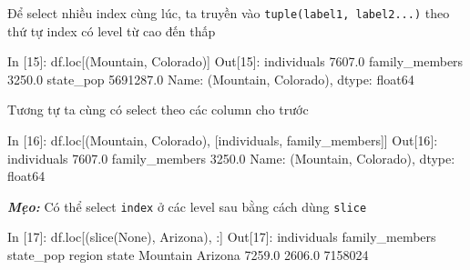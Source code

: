 \documentclass[
]{book}
\makeatletter
\newenvironment{Shaded}{\begin{snugshade}}{\end{snugshade}}
\newcommand{\BuiltInTok}[1]{#1}
\newcommand{\DecValTok}[1]{\textcolor[rgb]{0.00,0.00,0.81}{#1}}
\newcommand{\FloatTok}[1]{\textcolor[rgb]{0.00,0.00,0.81}{#1}}
\newcommand{\NormalTok}[1]{#1}
\newcommand{\StringTok}[1]{\textcolor[rgb]{0.31,0.60,0.02}{#1}}
\newcommand{\VariableTok}[1]{\textcolor[rgb]{0.00,0.00,0.00}{#1}}
\newenvironment{kframe}{%
\medskip{}
\setlength{\fboxsep}{.8em}
 \def\at@end@of@kframe{}%
 \ifinner\ifhmode%
  \def\at@end@of@kframe{\end{minipage}}%
  \begin{minipage}{\columnwidth}%
 \fi\fi%
 \def\FrameCommand##1{\hskip\@totalleftmargin \hskip-\fboxsep
 \colorbox{shadecolor}{##1}\hskip-\fboxsep
     \hskip-\linewidth \hskip-\@totalleftmargin \hskip\columnwidth}%
 \MakeFramed {\advance\hsize-\width
   \@totalleftmargin\z@ \linewidth\hsize
   \@setminipage}}%
 {\par\unskip\endMakeFramed%
 \at@end@of@kframe}
\newenvironment{rmdblock}[1]
  {
  \begin{itemize}
  \renewcommand{\labelitemi}{
    \raisebox{-.7\height}[0pt][0pt]{
      {\setkeys{Gin}{width=3em,keepaspectratio}\texttt{[image: images/\#1]}}
    }
  }
  \setlength{\fboxsep}{1em}
  \begin{kframe}
  \item
  }
  {
  \end{kframe}
  \end{itemize}
  }
\newenvironment{rmdtip}
  {\begin{rmdblock}{tip}}
  {\end{rmdblock}}
\makeatother
\begin{document}
Để select nhiều index cùng lúc, ta truyền vào \texttt{tuple(label1,\ label2...)} theo thứ tự index có level từ cao đến thấp

\begin{Shaded}
\begin{Highlighting}[]
\NormalTok{In [}\DecValTok{15}\NormalTok{]: df.loc[(}\StringTok{\textquotesingle{}Mountain\textquotesingle{}}\NormalTok{, }\StringTok{\textquotesingle{}Colorado\textquotesingle{}}\NormalTok{)]}
\NormalTok{Out[}\DecValTok{15}\NormalTok{]:}
\NormalTok{individuals          }\FloatTok{7607.0}
\NormalTok{family\_members       }\FloatTok{3250.0}
\NormalTok{state\_pop         }\FloatTok{5691287.0}
\NormalTok{Name: (Mountain, Colorado), dtype: float64}
\end{Highlighting}
\end{Shaded}

Tương tự ta cùng có select theo các column cho trước

\begin{Shaded}
\begin{Highlighting}[]
\NormalTok{In [}\DecValTok{16}\NormalTok{]: df.loc[(}\StringTok{\textquotesingle{}Mountain\textquotesingle{}}\NormalTok{, }\StringTok{\textquotesingle{}Colorado\textquotesingle{}}\NormalTok{), [}\StringTok{\textquotesingle{}individuals\textquotesingle{}}\NormalTok{, }\StringTok{\textquotesingle{}family\_members\textquotesingle{}}\NormalTok{]]}
\NormalTok{Out[}\DecValTok{16}\NormalTok{]:}
\NormalTok{individuals       }\FloatTok{7607.0}
\NormalTok{family\_members    }\FloatTok{3250.0}
\NormalTok{Name: (Mountain, Colorado), dtype: float64}
\end{Highlighting}
\end{Shaded}

\begin{rmdtip}
\textbf{\emph{Mẹo:}}
Có thể select \texttt{index} ở các level sau bằng cách dùng \texttt{slice}
\end{rmdtip}

\begin{Shaded}
\begin{Highlighting}[]
\NormalTok{In [}\DecValTok{17}\NormalTok{]: df.loc[(}\BuiltInTok{slice}\NormalTok{(}\VariableTok{None}\NormalTok{), }\StringTok{\textquotesingle{}Arizona\textquotesingle{}}\NormalTok{), :]}
\NormalTok{Out[}\DecValTok{17}\NormalTok{]:}
\NormalTok{                  individuals  family\_members  state\_pop}
\NormalTok{region   state                                          }
\NormalTok{Mountain Arizona       }\FloatTok{7259.0}          \FloatTok{2606.0}    \DecValTok{7158024}
\end{Highlighting}
\end{Shaded}
\end{document}

